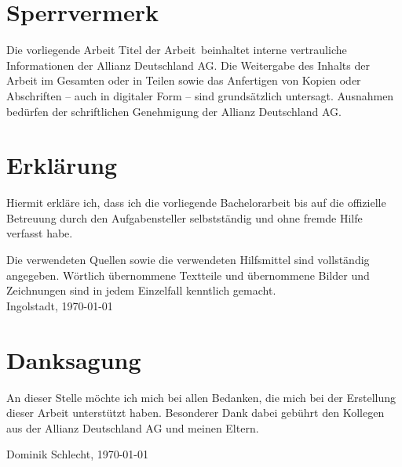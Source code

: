 


\chapter*{Sperrvermerk}
Die vorliegende Arbeit \glqq Titel der Arbeit\grqq\ beinhaltet interne vertrauliche Informationen der Allianz Deutschland AG. Die Weitergabe des Inhalts der Arbeit im Gesamten oder in Teilen sowie das Anfertigen von Kopien oder Abschriften -- auch in digitaler Form -- sind grunds\"{a}tzlich untersagt. Ausnahmen bed\"{u}rfen der schriftlichen Genehmigung der Allianz Deutschland AG.

\chapter*{Erkl\"{a}rung}
Hiermit erkl\"{a}re ich, dass ich die vorliegende Bachelorarbeit bis auf die offizielle Betreuung durch den Aufgabensteller selbstst\"{a}ndig und ohne fremde Hilfe verfasst habe.\par
Die verwendeten Quellen sowie die verwendeten Hilfsmittel sind vollst\"{a}ndig angegeben. W\"{o}rtlich \"{u}bernommene Textteile und \"{u}bernommene Bilder und Zeichnungen sind in jedem Einzelfall kenntlich gemacht. \\[10ex]
Ingolstadt, \today
{}

\chapter*{Danksagung}
An dieser Stelle möchte ich mich bei allen Bedanken, die mich bei der Erstellung dieser Arbeit unterstützt haben. Besonderer Dank dabei gebührt den Kollegen aus der Allianz Deutschland AG und meinen Eltern.

\begin{flushright}
\sffamily Dominik Schlecht, \today
\end{flushright}


